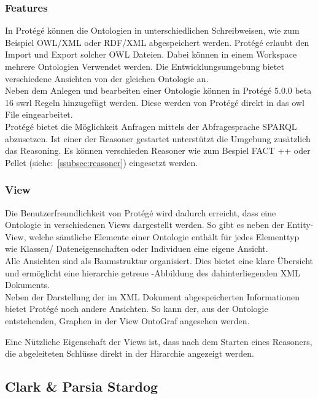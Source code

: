 \subsubsection{Features}
\label{subsubsec:protege_features}

In Protégé können die Ontologien in unterschiedlichen Schreibweisen, wie zum Beispiel OWL/XML oder RDF/XML abgespeichert werden. Protégé erlaubt den Import und Export solcher OWL Dateien. Dabei können in einem Workspace mehrere Ontologien Verwendet werden. Die Entwicklungsumgebung bietet verschiedene Ansichten von der gleichen Ontologie an. \\
Neben dem Anlegen und bearbeiten einer Ontologie können in Protégé 5.0.0 beta 16 swrl Regeln hinzugefügt werden. Diese werden von Protégé direkt in das owl File eingearbeitet. \\
Protégé bietet die Möglichkeit Anfragen mittels der Abfragesprache SPARQL abzusetzen. Ist einer der Reasoner gestartet unterstützt die Umgebung zusätzlich das Reasoning. Es können verschieden Reasoner wie zum Bespiel FACT ++ oder Pellet (siehe:~\ref{ssubsec:reasoner}) eingesetzt werden.\cite{protegeFeatures} 


\subsubsection{View}
\label{subsubsec:protege_view}

Die Benutzerfreundlichkeit von Protégé wird dadurch erreicht, dass eine Ontologie in verschiedenen Views dargestellt werden. So gibt es neben der Entity-View, welche sämtliche Elemente einer Ontologie enthält für jedes Elementtyp wie Klassen/ Dateneigenschaften oder Individuen eine eigene Ansicht.\\
Alle Ansichten sind als Baumstruktur organisiert. Dies bietet eine klare Übersicht und ermöglicht eine hierarchie getreue -Abbildung des dahinterliegenden XML Dokuments.\\ 
Neben der Darstellung der im XML Dokument abgespeicherten Informationen bietet Protégé noch andere Ansichten. So kann der, aus der Ontologie entstehenden, Graphen in der View OntoGraf angesehen werden.\cite{protegeView}

Eine Nützliche Eigenschaft der Views ist, dass nach dem Starten eines Reasoners, die abgeleiteten Schlüsse direkt in der Hirarchie angezeigt werden.

\subsection{Clark \& Parsia Stardog}
\label{subsec:stardog}

